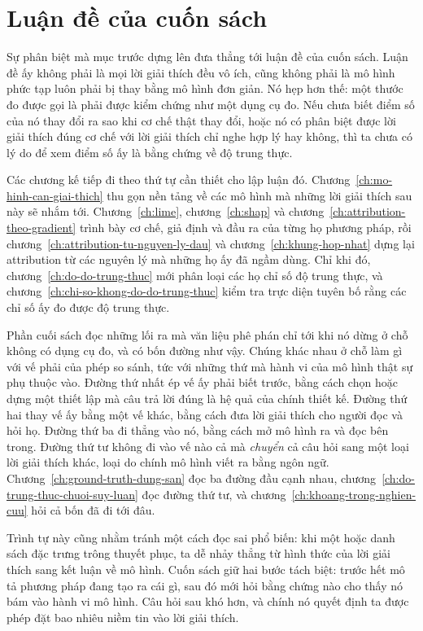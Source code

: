 \section{Luận đề của cuốn sách}
\label{sec:ch01-luan-de-cua-sach}

Sự phân biệt mà mục trước dựng lên đưa thẳng tới luận đề của cuốn
sách. Luận đề ấy không phải là mọi lời giải thích đều vô ích, cũng không
phải là mô hình phức tạp luôn phải bị thay bằng mô hình đơn giản. Nó hẹp
hơn thế: một thước đo được gọi là  phải được
kiểm chứng như một dụng cụ đo. Nếu chưa biết điểm số của nó thay đổi ra sao
khi cơ chế thật thay đổi, hoặc nó có phân biệt được lời giải thích đúng cơ
chế với lời giải thích chỉ nghe hợp lý hay không, thì ta chưa có lý do để xem
điểm số ấy là bằng chứng về độ trung thực.

Các chương kế tiếp đi theo thứ tự cần thiết cho lập luận đó.
Chương~\ref{ch:mo-hinh-can-giai-thich} thu gọn nền tảng về các mô hình mà
những lời giải thích sau này sẽ nhắm tới. Chương~\ref{ch:lime},
chương~\ref{ch:shap} và chương~\ref{ch:attribution-theo-gradient} trình bày cơ
chế, giả định và đầu ra của từng họ phương pháp, rồi
chương~\ref{ch:attribution-tu-nguyen-ly-dau} và
chương~\ref{ch:khung-hop-nhat} dựng lại attribution từ các nguyên lý mà những
họ ấy đã ngầm dùng. Chỉ khi đó,
chương~\ref{ch:do-do-trung-thuc} mới phân loại các họ chỉ số độ trung thực, và
chương~\ref{ch:chi-so-khong-do-do-trung-thuc} kiểm tra trực diện tuyên bố
rằng các chỉ số ấy đo được độ trung thực.

%
Phần cuối sách đọc những lối ra mà văn liệu phê phán chỉ tới khi nó dừng ở chỗ
không có dụng cụ đo, và có bốn đường như vậy. Chúng khác nhau ở chỗ làm gì với
vế phải của phép so sánh, tức với những thứ mà hành vi của mô hình thật sự phụ
thuộc vào. Đường thứ nhất ép vế ấy phải biết trước, bằng cách chọn hoặc dựng một
thiết lập mà câu trả lời đúng là hệ quả của chính thiết kế. Đường thứ hai thay
vế ấy bằng một vế khác, bằng cách đưa lời giải thích cho người đọc và hỏi họ.
Đường thứ ba đi thẳng vào nó, bằng cách mở mô hình ra và đọc bên trong. Đường
thứ tư không đi vào vế nào cả mà \emph{chuyển} cả câu hỏi sang một loại lời
giải thích khác, loại do chính mô hình viết ra bằng ngôn ngữ.
Chương~\ref{ch:ground-truth-dung-san} đọc ba đường đầu cạnh nhau,
chương~\ref{ch:do-trung-thuc-chuoi-suy-luan} đọc đường thứ tư, và
chương~\ref{ch:khoang-trong-nghien-cuu} hỏi cả bốn đã đi tới đâu.

Trình tự này cũng nhằm tránh một cách đọc sai phổ biến: khi một 
hoặc danh sách đặc trưng trông thuyết phục, ta dễ nhảy thẳng từ hình thức của
lời giải thích sang kết luận về mô hình. Cuốn sách giữ hai bước tách biệt:
trước hết mô tả phương pháp đang tạo ra cái gì, sau đó mới hỏi bằng chứng nào
cho thấy nó bám vào hành vi mô hình. Câu hỏi sau khó hơn, và chính nó quyết
định ta được phép đặt bao nhiêu niềm tin vào lời giải thích.
